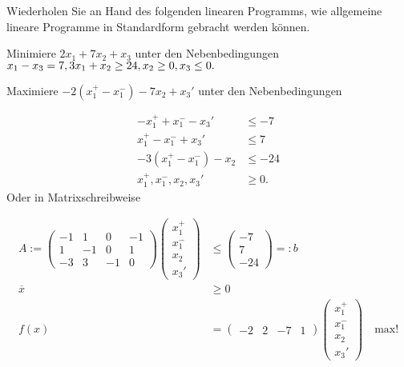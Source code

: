 
\begin{exercise}

Wiederholen Sie an Hand des folgenden linearen Programms, wie allgemeine lineare
Programme in Standardform gebracht werden können.



\begin{adjustwidth}{4cm}{}
Minimiere $2x_1 + 7x_2 + x_3$ unter den Nebenbedingungen \\
  $x_1 - x_3 = 7, \\
  3x_1 + x_2 \geq 24, \\
  x_2 \geq 0, \\
  x_3 \leq 0.$
\end{adjustwidth}

\end{exercise}



\begin{solution}

Maximiere $-2(x_1^+ - x_1^-) - 7x_2 + x_3'$ unter den Nebenbedingungen

\begin{align*}
  -x_1^+ + x_1^- - x_3' &\leq -7 \\
  x_1^+ - x_1^- + x_3' &\leq 7 \\
  -3(x_1^+ - x_1^-) - x_2 &\leq -24 \\
  x_1^+,x_1^-,x_2,x_3' &\geq 0.
\end{align*}
Oder in Matrixschreibweise

\begin{align*}
  A := \begin{pmatrix}
    -1 & 1 & 0 & -1 \\
    1 & -1 & 0 & 1 \\
    -3 & 3 & -1 & 0
  \end{pmatrix}
  \begin{pmatrix}
    x_1^+ \\ x_1^- \\ x_2 \\ x_3'
  \end{pmatrix}
  &\leq
  \begin{pmatrix}
    -7 \\ 7 \\ -24
  \end{pmatrix} =: b \\
  \overline{x} &\geq 0 \\
  f(x) &= \begin{pmatrix}
    -2 & 2 & -7 & 1
  \end{pmatrix}
  \begin{pmatrix}
    x_1^+ \\ x_1^- \\ x_2 \\ x_3'
  \end{pmatrix}
  \quad \text{max!}
\end{align*}

\end{solution}
